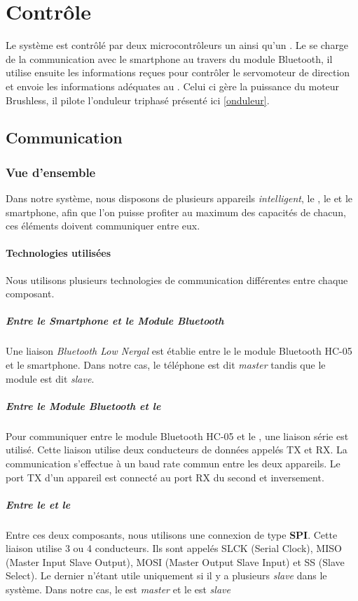 	\chapter{Contrôle}
	Le système est contrôlé par deux microcontrôleurs un \pic ainsi qu'un \dspic. Le \pic se charge de la communication avec le smartphone au travers du module Bluetooth, il utilise ensuite les informations reçues pour contrôler le servomoteur de direction et envoie les informations adéquates au \dspic. Celui ci gère la puissance du moteur Brushless, il pilote l'onduleur triphasé présenté ici \ref{onduleur}.%
		\section{Communication}
			\subsection{Vue d'ensemble}
				Dans notre système, nous disposons de plusieurs appareils \textit{intelligent}, le \pic , le \dspic et le smartphone, afin que l'on puisse profiter au maximum des capacités de chacun, ces éléments doivent communiquer entre eux.
				\subsubsection{Technologies utilisées}
				Nous utilisons plusieurs technologies de communication différentes entre chaque composant.
				\paragraph{Entre le \textit{Smartphone} et le \textit{Module Bluetooth}} Une liaison \textit{Bluetooth Low Nergal} est établie entre le le module Bluetooth HC-05 et le smartphone. Dans notre cas, le téléphone est dit \textit{master} tandis que le module est dit \textit{slave}.
				\paragraph{Entre le \textit{Module Bluetooth} et le \textit{\pic} } Pour communiquer entre le module Bluetooth HC-05 et le \pic, une liaison série est utilisé. Cette liaison utilise deux conducteurs de données appelés TX et RX. La communication s'effectue à un baud rate commun entre les deux appareils. Le port TX d'un appareil est connecté au port RX du second et inversement.
				\paragraph{Entre le \textit{\dspic} et le \textit{\pic}} Entre ces deux composants, nous utilisons une connexion de type \textbf{SPI}. Cette liaison utilise 3 ou 4 conducteurs. Ils sont appelés SLCK (\textsf{Serial Clock}), MISO (\textsf{Master Input Slave Output}), MOSI (\textsf{Master Output Slave Input})  et SS (\textsf{Slave Select}). Le dernier n'étant utile uniquement si il y a plusieurs \textit{slave} dans le système. Dans notre cas, le \pic est \textit{master} et le \dspic est \textit{slave}
				
